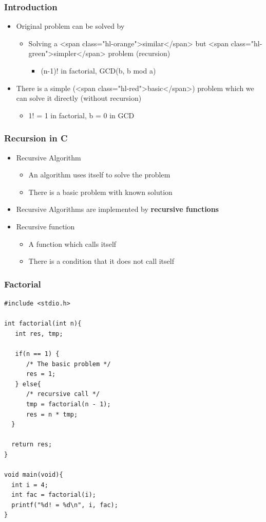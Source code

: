 \documentclass{../c-lecture}
\begin{document}
\begin{frame}
  \frametitle{Introduction}
  \begin{itemize}
    \item Original problem can be solved by
    \begin{itemize}
      \item
        Solving a <span class="hl-orange">similar</span> but
        <span class="hl-green">simpler</span> problem (recursion)

      \begin{itemize}
        \item (n-1)! in factorial, GCD(b, b mod a)
      \end{itemize}
    \end{itemize}
    \item
      There is a simple (<span class="hl-red">basic</span>) problem which we can
      solve it directly (without recursion)

    \begin{itemize}
      \item 1! = 1 in factorial, b = 0 in GCD
    \end{itemize}
  \end{itemize}
\end{frame}

\begin{frame}
  \frametitle{Recursion in C}
  \begin{itemize}
    \item Recursive Algorithm
    \begin{itemize}
      \item An algorithm uses itself to solve the problem
      \item There is a basic problem with known solution
    \end{itemize}
    \item
      Recursive Algorithms are implemented by
      \textbf{\color{Orange} recursive functions}

    \item Recursive function
    \begin{itemize}
      \item A function which calls itself
      \item There is a condition that it does not call itself
    \end{itemize}
  \end{itemize}
\end{frame}

\begin{frame}[fragile]
  \frametitle{Factorial}
  \begin{verbatim}
#include <stdio.h>

int factorial(int n){
   int res, tmp;

   if(n == 1) {
      /* The basic problem */
      res = 1;
   } else{
      /* recursive call */
      tmp = factorial(n - 1);
      res = n * tmp;
  }

  return res;
}

void main(void){
  int i = 4;
  int fac = factorial(i);
  printf("%d! = %d\n", i, fac);
}
  \end{verbatim}
\end{frame}
\end{document}

